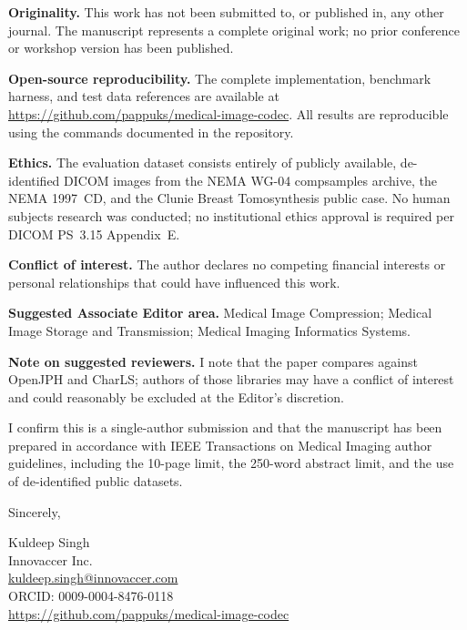 \documentclass[12pt]{article}
\begin{document}
\medskip
\noindent\textbf{Originality.}
This work has not been submitted to, or published in, any other journal.
The manuscript represents a complete original work; no prior conference or
workshop version has been published.

\medskip
\noindent\textbf{Open-source reproducibility.}
The complete implementation, benchmark harness, and test data references are
available at \url{https://github.com/pappuks/medical-image-codec}. All results
are reproducible using the commands documented in the repository.

\medskip
\noindent\textbf{Ethics.}
The evaluation dataset consists entirely of publicly available, de-identified
DICOM images from the NEMA WG-04 compsamples archive, the NEMA 1997~CD, and
the Clunie Breast Tomosynthesis public case. No human subjects research was
conducted; no institutional ethics approval is required per DICOM PS~3.15
Appendix~E.

\medskip
\noindent\textbf{Conflict of interest.}
The author declares no competing financial interests or personal relationships
that could have influenced this work.

\medskip
\noindent\textbf{Suggested Associate Editor area.}
Medical Image Compression; Medical Image Storage and Transmission; Medical
Imaging Informatics Systems.

\medskip
\noindent\textbf{Note on suggested reviewers.}
I note that the paper compares against OpenJPH and CharLS; authors of those
libraries may have a conflict of interest and could reasonably be excluded
at the Editor's discretion.

\bigskip

I confirm this is a single-author submission and that the manuscript has been
prepared in accordance with IEEE Transactions on Medical Imaging author
guidelines, including the 10-page limit, the 250-word abstract limit, and the
use of de-identified public datasets.

\bigskip

\noindent Sincerely,

\bigskip\bigskip

\noindent Kuldeep Singh\\
Innovaccer Inc.\\
\href{mailto:kuldeep.singh@innovaccer.com}{kuldeep.singh@innovaccer.com}\\
ORCID: 0009-0004-8476-0118\\
\url{https://github.com/pappuks/medical-image-codec}
\end{document}
